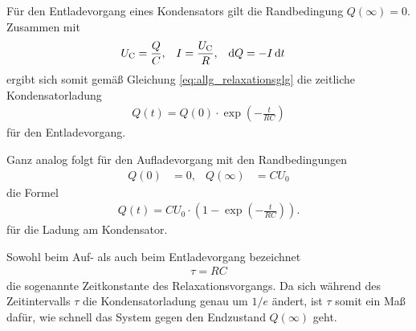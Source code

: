 \noindent
Für den Entladevorgang eines Kondensators gilt die Randbedingung $Q(\infty) = 0$.
Zusammen mit 
\begin{align}
    U_\text{C} &= \frac{Q}{C}, & I &= \frac{U_\text{C}}{R}, & \mathop{}\!\mathrm{d}{Q} &= - I \mathop{}\!\mathrm{d}{t}
    \label{eq:gesetze}
\end{align}
ergibt sich somit gemäß Gleichung \eqref{eq:allg_relaxationsglg} die zeitliche Kondensatorladung
\begin{align}
    Q(t) = Q(0) \cdot \exp\left(- \frac{t}{RC}\right)
    \label{eq:entladung}
\end{align}
für den Entladevorgang.

\noindent
Ganz analog folgt für den Aufladevorgang mit den Randbedingungen
\begin{align*}
    Q(0) &= 0, & Q(\infty) &= C U_0 
\end{align*}
die Formel 
\begin{align}
    Q(t) = C U_0 \cdot \left(1-\exp\left(-\frac{t}{RC}\right)\right).
\end{align}
für die Ladung am Kondensator.

\noindent
Sowohl beim Auf- als auch beim Entladevorgang bezeichnet
\begin{align}
    \tau = R C
\end{align}
die sogenannte Zeitkonstante des Relaxationsvorgangs.
Da sich während des Zeitintervalls $\tau$ die Kondensatorladung genau um $1/e$ ändert,
ist $\tau$ somit ein Maß dafür, wie schnell das System gegen den Endzustand $Q(\infty)$ geht.